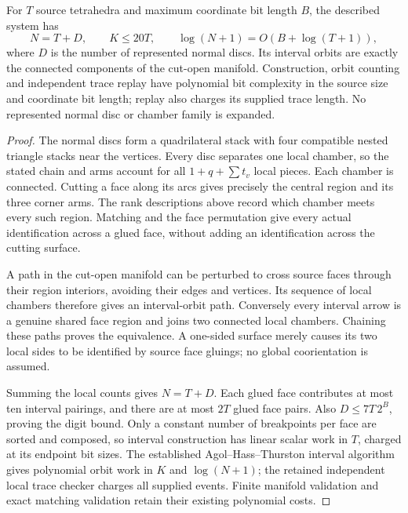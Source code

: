 \begin{proposition}
For $T$ source tetrahedra and maximum coordinate bit length $B$, the described
system has
\[
 N=T+D,\qquad K\le20T,\qquad
 \log(N+1)=O(B+\log(T+1)),
\]
where $D$ is the number of represented normal discs. Its interval orbits
are exactly the connected components of the cut-open manifold. Construction,
orbit counting and independent trace replay have polynomial bit complexity
in the source size and coordinate bit length; replay also charges its supplied
trace length. No represented normal disc or chamber family is expanded.
\end{proposition}
\begin{proof}
The normal discs form a quadrilateral stack with four compatible nested
triangle stacks near the vertices. Every disc separates one local chamber,
so the stated chain and arms account for all $1+q+\sum t_v$ local pieces.
Each chamber is connected. Cutting a face along its arcs gives precisely the
central region and its three corner arms. The rank descriptions above record
which chamber meets every such region. Matching and the face permutation
give every actual identification across a glued face, without adding an
identification across the cutting surface.

A path in the cut-open manifold can be perturbed to cross source faces
through their region interiors, avoiding their edges and vertices. Its
sequence of local chambers therefore gives an interval-orbit path.
Conversely every interval arrow is a genuine shared face region and joins
two connected local chambers. Chaining these paths proves the equivalence.
A one-sided surface merely causes its two local sides to be identified by
source face gluings; no global coorientation is assumed.

Summing the local counts gives $N=T+D$. Each glued face contributes at most
ten interval pairings, and there are at most $2T$ glued face pairs. Also
$D\le7T\,2^B$, proving the digit bound. Only a constant number of breakpoints
per face are sorted and composed, so interval construction has linear scalar
work in $T$, charged at its endpoint bit sizes. The established
Agol--Hass--Thurston interval algorithm gives polynomial orbit work in
$K$ and $\log(N+1)$\cite{aht-orbits}; the retained independent local trace
checker charges all supplied events. Finite manifold validation and exact
matching validation retain their existing polynomial costs.
\end{proof}

